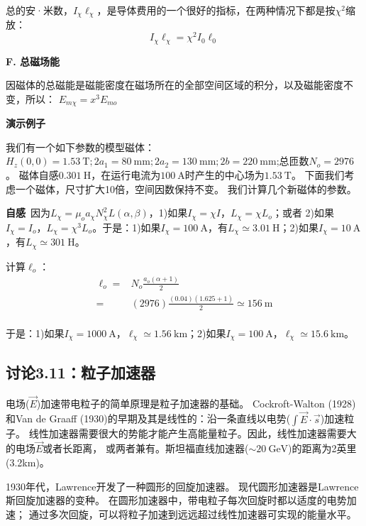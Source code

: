 总的安·米数，$I_\chi \ell_\chi$，是导体费用的一个很好的指标，在两种情况下都是按$\chi^2$缩放：
\begin{equation}
I_\chi \ell_\chi=\chi^2 I_0 \ell_0 %
\end{equation}

\textbf{F. 总磁场能}

因磁体的总磁能是磁能密度在磁场所在的全部空间区域的积分，以及磁能密度不变，所以：
$E_{m\chi}=x^3E_{mo}$

\textbf{演示例子}

我们有一个如下参数的模型磁体：$H_z(0, 0) = 1.53\ \mathrm{T}; 2a_1 =
80\ \mathrm{mm}; 2a_2 = 130\ \mathrm{mm}; 2b = 220\ \mathrm{mm}$;总匝数$N_o = 2976$。
磁体自感$0.301\ \mathrm{H}$，在运行电流为$100\ \mathrm{A}$时产生的中心场为$1.53\ \mathrm{T}$。
下面我们考虑一个磁体，尺寸扩大10倍，空间因数保持不变。
我们计算几个新磁体的参数。

\textbf{自感}\ 因为$L_\chi=\mu_o a_\chi N_\chi^2L(\alpha,\beta)$，1)如果$I_\chi=\chi I$，$L_\chi=\chi L_o$；或者
2)如果$I_\chi=I_o$，$L_\chi=\chi^3L_o$。于是：1)如果$I_\chi=100\ \mathrm{A}$，有$L_\chi\simeq 3.01\ \mathrm{H}$；2)如果$I_\chi=10\ \mathrm{A}$，有$L_\chi\simeq 301\ \mathrm{H}$。

计算$\ell_o$：
\begin{equation*}
\begin{split}
\ell_{o}=&N_{o}\frac{a_{o}(\alpha+1)}{2}\\
=&(2976)\frac{(0.04)(1.625+1)}{2}\simeq 156\ \mathrm{m}\\
\end{split}
\end{equation*}

于是：1)如果$I_\chi=1000\ \mathrm{A}$，$\ell_{\chi}\simeq 1.56\ \mathrm{km}$；2)如果$I_\chi=100\ \mathrm{A}$，$\ell_{\chi}\simeq 15.6\ \mathrm{km}$。 



\subsection{讨论3.11：粒子加速器}
电场($\vec{E}$)加速带电粒子的简单原理是粒子加速器的基础。
Cockroft-Walton (1928)和Van de Graaff (1930)的早期及其是线性的：沿一条直线以电势($\int\vec{E}\cdot\vec{s}$)加速粒子。
线性加速器需要很大的势能才能产生高能量粒子。因此，线性加速器需要大的电场$\vec{E}$或者长距离，
或两者兼有。斯坦福直线加速器($\sim 20\ \mathrm{GeV} $)的距离为2英里(3.2km)。

1930年代，Lawrence开发了一种圆形的回旋加速器。
现代圆形加速器是Lawrence斯回旋加速器的变种。
在圆形加速器中，带电粒子每次回旋时都以适度的电势加速；
通过多次回旋，可以将粒子加速到远远超过线性加速器可实现的能量水平。

